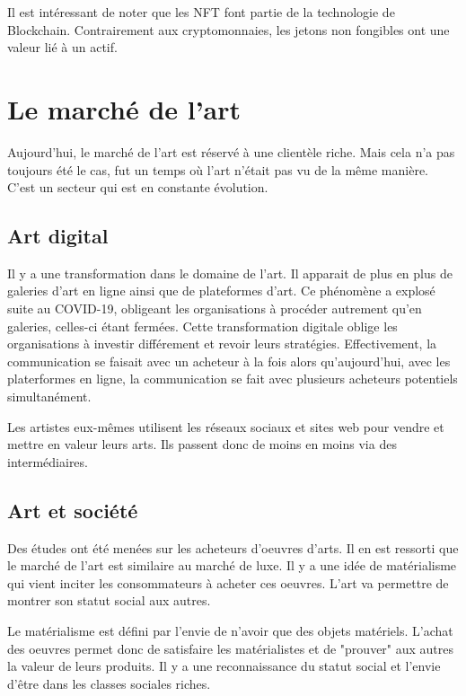 \documentclass[11pt]{article}
\begin{document}
Il est intéressant de noter que les NFT font partie de la technologie de Blockchain. Contrairement aux cryptomonnaies, les jetons non fongibles ont une valeur lié à un actif. \cite{dumas_10_2022} 

\section{Le marché de l'art} %
Aujourd'hui, le marché de l'art est réservé à une clientèle riche. Mais cela n'a pas toujours été le cas, fut un temps où l'art n'était pas vu de la même manière. C'est un secteur qui est en constante évolution. \cite{dumas_18_2022} 
\subsection{Art digital} %
Il y a une transformation dans le domaine de l'art. Il apparait de plus en plus de galeries d'art en ligne ainsi que de plateformes d'art. Ce phénomène a explosé suite au COVID-19, obligeant les organisations à procéder autrement qu'en galeries, celles-ci étant fermées. Cette transformation digitale oblige les organisations à investir différement et revoir leurs stratégies. Effectivement, la communication se faisait avec un acheteur à la fois alors qu'aujourd'hui, avec les platerformes en ligne, la communication se fait avec plusieurs acheteurs potentiels simultanément. 

Les artistes eux-mêmes utilisent les réseaux sociaux et sites web pour vendre et mettre en valeur leurs arts. Ils passent donc de moins en moins via des intermédiaires. 
\subsection{Art et société} %
Des études ont été menées sur les acheteurs d'oeuvres d'arts. Il en est ressorti que le marché de l'art est similaire au marché de luxe. Il y a une idée de matérialisme qui vient inciter les consommateurs à acheter ces oeuvres. L'art va permettre de montrer son statut social aux autres.

Le matérialisme est défini par l'envie de n'avoir que des objets matériels. L'achat des oeuvres permet donc de satisfaire les matérialistes et de "prouver" aux autres la valeur de leurs produits. Il y a une reconnaissance du statut social et l'envie d'être dans les classes sociales riches. \cite{sestino_how_2022} \cite{noauthor_nfts_nodate}
\end{document}
